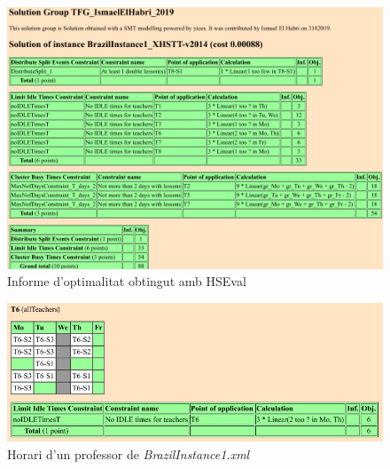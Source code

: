 \documentclass[11pt,a4paper,twoside]{report}
\begin{document}
  \begin{figure}
    \centering
    \includegraphics[width=\textwidth]{Diagrames/brazil1_report.png}
    \caption{Informe d'optimalitat obtingut amb HSEval}
    \label{fig:bi1_report}
  \end{figure}
  \newpage
  \begin{figure}[H]
    \centering
    \includegraphics[width=\textwidth]{Diagrames/brazil1_teach.png}
    \caption{Horari d'un professor de \textit{BrazilInstance1.xml}}
    \label{fig:bi1_teach}
  \end{figure}
\end{document}
